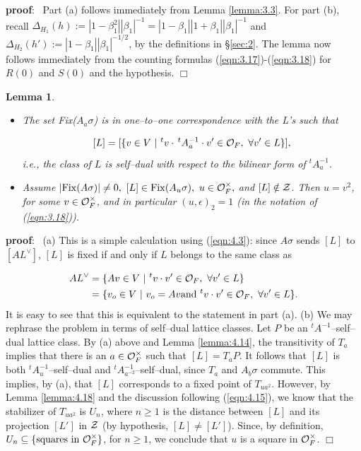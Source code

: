 \documentclass[12pt,letterpaper]{article}
\newtheorem{lemma}[theorem]{Lemma}
\def\zz{{\cal Z}}
\def\pf{{\bf proof}:\ }
\def\qed{$\Box$}
\def\eps{\epsilon}
\def\off{{\cal O}_F}
\begin{document}
\pf
Part (a) follows immediately from Lemma \ref{lemma:3.3}. 
For part (b), recall $\Delta_{H_1}(h):=|1-\beta_1^2||\beta_1|^{-1}
=|1-\beta_1||1+\beta_1||\beta_1|^{-1}$ and
$\Delta_{H_2}(h'):=|1-\beta_1||\beta_1|^{-1/2}$, 
by the definitions in \S \ref{sec:2}.
The lemma now follows immediately from the counting 
formulas (\ref{eqn:3.17})-(\ref{eqn:3.18}) for
$R(0)$ and $S(0)$ and the hypothesis.
\qed

\begin{lemma}
\label{lemma:5.2}
\begin{itemize}
\item[(a)] 
The set {\rm Fix}($A_a\sigma$) is in one--to--one correspondence with the
L's such that

\[
[L] = [\{v\in V\ |\ {^{t}v}\cdot \, ^tA_a^{-1}\cdot v'\in \off ,
\ \forall v'\in L\}],
\]
i.e., the class of $L$ is self--dual with respect to the bilinear form of
$^tA_a^{-1}$.

\item[(b)] 
Assume $|{\rm Fix}(A\sigma )|\not= 0,\
[L]\in {\rm Fix}(A_u\sigma ),\ u\in \off^{\times},$
and $[L]\notin\zz$. Then $u=v^2$, for some $v\in\off^{\times}$, and in
particular $(u,\eps)_2=1$ (in the notation of (\ref{eqn:3.18})).
\end{itemize}
\end{lemma}

\pf
(a) This is a simple calculation using (\ref{eqn:4.3}): 
since $A\sigma$ sends $[L]$
to $[AL^{\vee}]$, $[L]$ is fixed if and only if $L$ belongs to the same
class as

\[
\begin{split}
AL^{\vee}
&=\{Av\in V\ |\ {^{t}v}\cdot v'\in \off ,
\ \forall v'\in L\}\\
&=\{v_o\in V\ |\  v_o=Av{\rm  and }\ {^{t}v}\cdot v'\in \off ,
\ \forall v'\in L\}.
\end{split}
\]
It is easy to see that this is equivalent to the statement in part (a).
\newline
(b) We may rephrase the problem in terms of self--dual lattice
classes. 
Let $P$ be an $^tA^{-1}$--self--dual lattice class. 
By (a) above and Lemma \ref{lemma:4.14},
the transitivity of $T_a$ implies that
there is an $a\in\off^{\times}$ such that $[L]=T_aP$. It follows that
$[L]$ is both
$^tA_u^{-1}$--self--dual and $^tA_{a^{-2}}^{-1}$--self--dual, since $T_a$ and
$A_b\sigma$ commute. 
This implies, by (a), that $[L]$ corresponds to a fixed
point of $T_{ua^2}$. 
However, by Lemma \ref{lemma:4.18} and the discussion following 
(\ref{eqn:4.15}), we know that the stabilizer of 
$T_{ua^2}$ is $U_n$,
where $n\geq 1$ is the distance between $[L]$ and its
projection $[L']$ in $\zz$ (by hypothesis, $[L]\not= [L']$).
Since, by definition,
$U_n \subseteq \{ {\rm squares\ in\ }\off^{\times}\}$, for $n\geq 1$, we
conclude that $u$ is a square in $\off^{\times}$.
\qed
\end{document}
